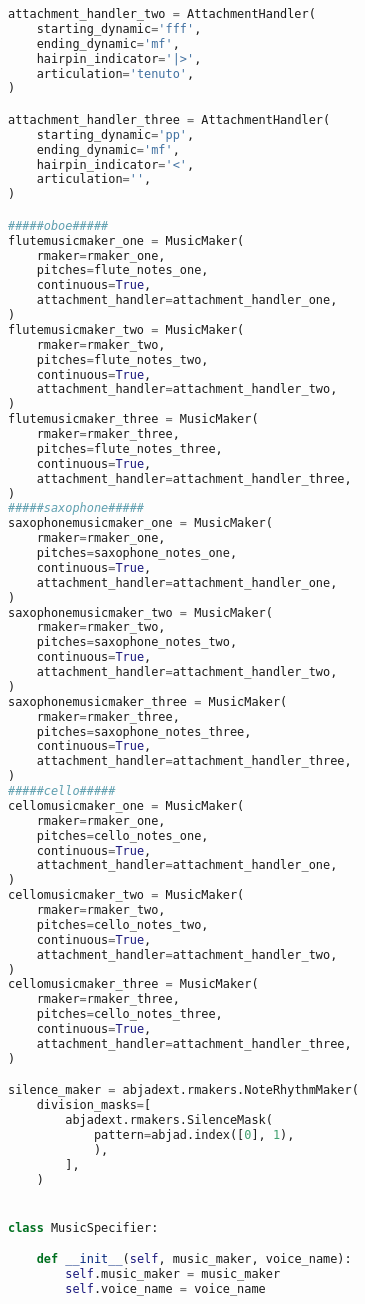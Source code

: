 \begin{lstlisting}[language=Python, caption=Four Ages of Sand Segment\_II]
attachment_handler_two = AttachmentHandler(
    starting_dynamic='fff',
    ending_dynamic='mf',
    hairpin_indicator='|>',
    articulation='tenuto',
)

attachment_handler_three = AttachmentHandler(
    starting_dynamic='pp',
    ending_dynamic='mf',
    hairpin_indicator='<',
    articulation='',
)

#####oboe#####
flutemusicmaker_one = MusicMaker(
    rmaker=rmaker_one,
    pitches=flute_notes_one,
    continuous=True,
    attachment_handler=attachment_handler_one,
)
flutemusicmaker_two = MusicMaker(
    rmaker=rmaker_two,
    pitches=flute_notes_two,
    continuous=True,
    attachment_handler=attachment_handler_two,
)
flutemusicmaker_three = MusicMaker(
    rmaker=rmaker_three,
    pitches=flute_notes_three,
    continuous=True,
    attachment_handler=attachment_handler_three,
)
#####saxophone#####
saxophonemusicmaker_one = MusicMaker(
    rmaker=rmaker_one,
    pitches=saxophone_notes_one,
    continuous=True,
    attachment_handler=attachment_handler_one,
)
saxophonemusicmaker_two = MusicMaker(
    rmaker=rmaker_two,
    pitches=saxophone_notes_two,
    continuous=True,
    attachment_handler=attachment_handler_two,
)
saxophonemusicmaker_three = MusicMaker(
    rmaker=rmaker_three,
    pitches=saxophone_notes_three,
    continuous=True,
    attachment_handler=attachment_handler_three,
)
#####cello#####
cellomusicmaker_one = MusicMaker(
    rmaker=rmaker_one,
    pitches=cello_notes_one,
    continuous=True,
    attachment_handler=attachment_handler_one,
)
cellomusicmaker_two = MusicMaker(
    rmaker=rmaker_two,
    pitches=cello_notes_two,
    continuous=True,
    attachment_handler=attachment_handler_two,
)
cellomusicmaker_three = MusicMaker(
    rmaker=rmaker_three,
    pitches=cello_notes_three,
    continuous=True,
    attachment_handler=attachment_handler_three,
)

silence_maker = abjadext.rmakers.NoteRhythmMaker(
    division_masks=[
        abjadext.rmakers.SilenceMask(
            pattern=abjad.index([0], 1),
            ),
        ],
    )


class MusicSpecifier:

    def __init__(self, music_maker, voice_name):
        self.music_maker = music_maker
        self.voice_name = voice_name



\end{lstlisting}
